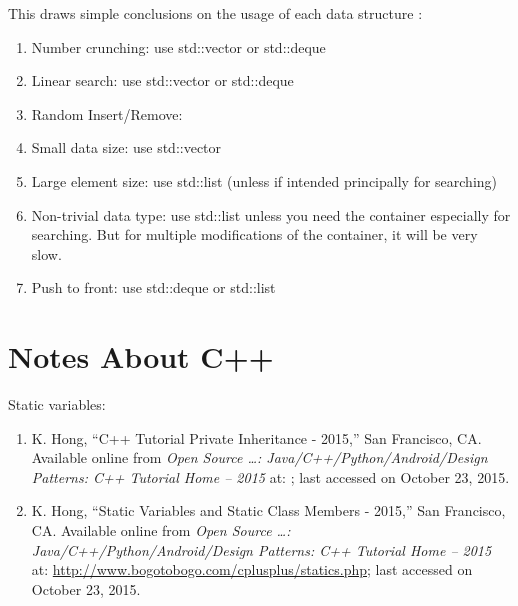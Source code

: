 This draws simple conclusions on the usage of each data structure \cite{Bulka2000,Josuttis1999a}: \vspace{-0.3cm}
\begin{enumerate} \itemsep -4pt
\item Number crunching: use std::vector or std::deque
\item Linear search: use std::vector or std::deque
\item Random Insert/Remove:
\item Small data size: use std::vector
\item Large element size: use std::list (unless if intended principally for searching)
\item Non-trivial data type: use std::list unless you need the container especially for searching. But for multiple modifications of the container, it will be very slow.
\item Push to front: use std::deque or std::list
\end{enumerate}






\section{Notes About C++}
\label{sec:NotesAboutCpp}


Static variables: \vspace{-0.3cm}
\begin{enumerate} \itemsep -4pt
\item K. Hong, ``C++ Tutorial
Private Inheritance - 2015,'' San Francisco, CA. Available online from {\it Open Source \dots: Java/C++/Python/Android/Design Patterns: C++ Tutorial Home -- 2015} at: \url{}; last accessed on October 23, 2015.
\item K. Hong, ``Static Variables and Static Class Members - 2015,'' San Francisco, CA. Available online from {\it Open Source \dots: Java/C++/Python/Android/Design Patterns: C++ Tutorial Home -- 2015} at: \url{http://www.bogotobogo.com/cplusplus/statics.php}; last accessed on October 23, 2015.
\end{enumerate}












